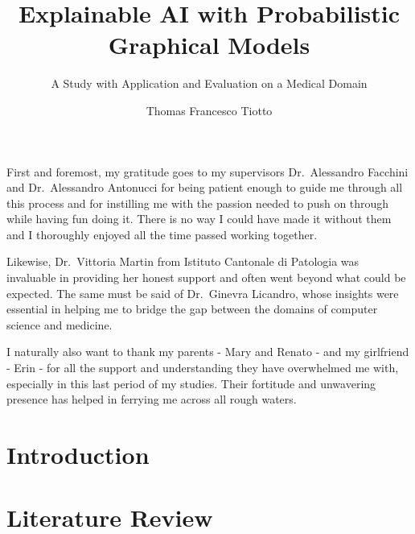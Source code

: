 \documentclass[mscthesis]{usiinfthesis}
\title{Explainable AI with Probabilistic Graphical Models} %
\subtitle{A Study with Application and Evaluation on a Medical Domain} %
\author{Thomas Francesco Tiotto} %
\begin{document}
\maketitle %

\frontmatter %

\begin{abstract}

\end{abstract}

\begin{acknowledgements}
First and foremost, my gratitude goes to my supervisors Dr.\ Alessandro Facchini and Dr.\ Alessandro Antonucci for being patient enough to guide me through all this process and for instilling me with the passion needed to push on through while having fun doing it.
There is no way I could have made it without them and I thoroughly enjoyed all the time passed working together.

Likewise, Dr.\ Vittoria Martin from Istituto Cantonale di Patologia was invaluable in providing her honest support and often went beyond what could be expected.
The same must be said of Dr.\ Ginevra Licandro, whose insights were essential in helping me to bridge the gap between the domains of computer science and medicine.

I naturally also want to thank my parents - Mary and Renato - and my girlfriend - Erin - for all the support and understanding they have overwhelmed me with, especially in this last period of my studies.
Their fortitude and unwavering presence has helped in ferrying me across all rough waters.
\end{acknowledgements}

\tableofcontents 
\listoffigures %
\listoftables %

\mainmatter

\chapter{Introduction}\label{chap:introduction}



 
\chapter{Literature Review}\label{chap:literature-review}




\end{document}
